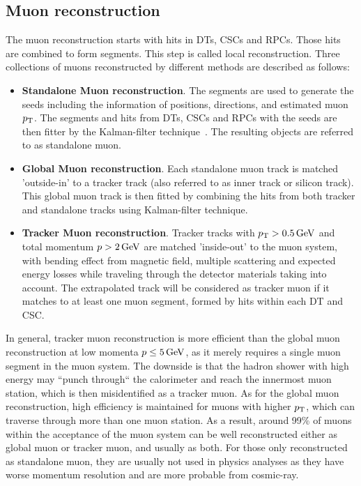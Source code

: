 		\subsection*{Muon reconstruction}
		The muon reconstruction starts with hits in DTs, CSCs and RPCs. Those hits are combined to form segments. This step is called local reconstruction. Three collections of muons reconstructed by different methods are described as follows:
		\begin{itemize}
		\item \textbf{Standalone Muon reconstruction}. The segments are used to generate the seeds including the information of positions, directions, and estimated muon $p_{\mathrm{T}}$. The segments and hits from DTs, CSCs and RPCs with the seeds are then fitter by the Kalman-filter technique~\cite{Fruhwirth:1987fm}. The resulting objects are referred to as standalone muon. 
		\item  \textbf{Global Muon reconstruction}.  Each standalone muon track is matched 'outside-in' to a tracker track (also referred to as inner track or silicon track). This global muon track is then fitted by combining the hits from both tracker and standalone tracks using Kalman-filter technique. 
		\item  \textbf{Tracker Muon reconstruction}. Tracker tracks with $p_{\mathrm{T}}>0.5\,\text{Ge\hspace{-.08em}V}$ and total momentum $p>2\,\text{Ge\hspace{-.08em}V}$ are matched 'inside-out' to the muon system, with bending effect from magnetic field, multiple scattering and expected energy losses while traveling through the detector materials taking into account. The extrapolated track will be considered as tracker muon if it matches to at least one muon segment, formed by hits within each DT and CSC.
		\end{itemize}
		In general, tracker muon reconstruction is more efficient than the global muon reconstruction at low momenta $p\leq 5\,\text{Ge\hspace{-.08em}V}$, as it merely requires a single muon segment in the muon system. The downside is that the hadron shower with high energy may ``punch through`` the calorimeter and reach the innermost muon station, which is then misidentified as a tracker muon.  As for the global muon reconstruction, high efficiency is maintained for muons with higher $p_{\mathrm{T}}$, which can traverse through more than one muon station. As a result, around 99\% of muons within the acceptance of the muon system can be well reconstructed either as global muon or tracker muon, and usually as both. For those only reconstructed as standalone muon, they are usually not used in physics analyses as they have worse momentum resolution and are more probable from cosmic-ray. 
		

